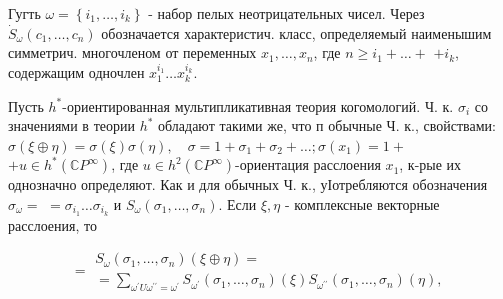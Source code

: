 \documentclass[10pt]{article}
\begin{document}
Гугть $\omega=\left\{i_{1}, \ldots, i_{k}\right\}$ - набор пелых неотрицательных чисел. Через $\dot{S}_{\omega}\left(c_{1}, \ldots, c_{n}\right)$ обозначается характеристич. класс, определяемый наименышим симметрич. многочленом от переменных $x_{1}, \ldots, x_{n}$, где $n \geqslant i_{1}+\ldots+$ $+i_{k}$, содержащим одночлен $x_{1}^{i_{1}} \ldots x_{k}^{i_{k}}$.



Пусть $h^{*}$-ориентированная мультипликативная теория когомологий. Ч. к. $\sigma_{i}$ со значениями в теории $h^{*}$ обладают такими же, что п обычные Ч. к., свойствами: $\sigma(\xi \oplus \eta)=\sigma(\xi) \sigma(\eta), \quad \sigma=1+\sigma_{1}+\sigma_{2}+\ldots ; \sigma\left(x_{1}\right)=1+$ $+u \in h^{*}\left(\mathbb{C} P^{\infty}\right)$, где $u \in h^{2}\left(\mathbb{C} P^{\infty}\right)$-ориентация расслоения $x_{1}$, к-рые их однозначно определяют. Как и для обычных Ч. к., уІотребляются обозначения $\sigma_{\omega}=$ $=\sigma_{i_{1}} \ldots \sigma_{i_{k}}$ и $S_{\omega}\left(\sigma_{1}, \ldots, \sigma_{n}\right)$. Если $\xi, \eta$ - комплексные векторные расслоения, то



\[

=\begin{gathered}

S_{\omega}\left(\sigma_{1}, \ldots, \sigma_{n}\right)(\xi \oplus \eta)= \\

=\sum_{\omega^{\prime} U \omega^{\prime \prime}=\omega^{\prime}} S_{\omega^{\prime}}\left(\sigma_{1}, \ldots, \sigma_{n}\right)(\xi) S_{\omega^{\prime \prime}}\left(\sigma_{1}, \ldots, \sigma_{n}\right)(\eta),

\end{gathered}

\]
\end{document}
